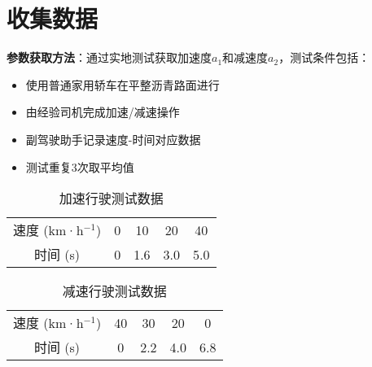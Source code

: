 \section{收集数据}\label{sec:Notation}

\textbf{参数获取方法}：通过实地测试获取加速度$a_1$和减速度$a_2$，测试条件包括：
\begin{itemize}[leftmargin=2em]
    \item 使用普通家用轿车在平整沥青路面进行
    \item 由经验司机完成加速/减速操作
    \item 副驾驶助手记录速度-时间对应数据
    \item 测试重复3次取平均值
\end{itemize}

\begin{table}[H]
    \centering
    \caption{加速行驶测试数据}
    \label{tab:accel_data}
    \begin{tabular}{ccccc}
        \toprule
        速度 (km·h$^{-1}$) & 0 & 10 & 20 & 40 \\
        时间 (s) & 0 & 1.6 & 3.0 & 5.0 \\
        \bottomrule
    \end{tabular}
\end{table}

\begin{table}[H]
    \centering
    \caption{减速行驶测试数据}
    \label{tab:decel_data}
    \begin{tabular}{ccccc}
        \toprule
        速度 (km·h$^{-1}$) & 40 & 30 & 20 & 0 \\
        时间 (s) & 0 & 2.2 & 4.0 & 6.8 \\
        \bottomrule
    \end{tabular}
\end{table}
